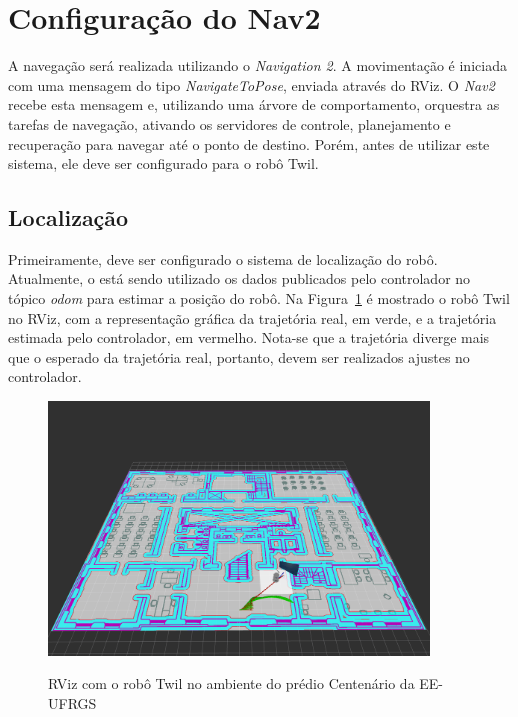 \documentclass[repeatfields,xlists,xpacks,oneside,yearsonly]{ufrgscca}
\begin{document}
\section{Configuração do Nav2}

A navegação será realizada utilizando o \textit{Navigation 2}.
A movimentação é iniciada com uma mensagem do tipo \textit{NavigateToPose},
enviada através do RViz.
O \textit{Nav2} recebe esta mensagem e, utilizando uma árvore de comportamento,
orquestra as tarefas de navegação, ativando os servidores de controle, planejamento
e recuperação para navegar até o ponto de destino.
Porém, antes de utilizar este sistema, ele deve ser configurado para o robô Twil.

\subsection{Localização}

Primeiramente, deve ser configurado o sistema de localização do robô.
Atualmente, o está sendo utilizado os dados publicados pelo controlador no
tópico \textit{odom} para estimar a posição do robô.
Na Figura~\ref{fig:robo_rviz} é mostrado o robô Twil no RViz, com a representação
gráfica da trajetória real, em verde, e a trajetória estimada pelo controlador,
em vermelho.
Nota-se que a trajetória diverge mais que o esperado da trajetória real, portanto,
devem ser realizados ajustes no controlador.

\begin{figure}[htbp]
    {
        \centering
        \caption{RViz com o robô Twil no ambiente do prédio Centenário da EE-UFRGS}
        \label{fig:robo_rviz}
        \includegraphics[width=0.9\textwidth]{erro_de_odometria.png}\\
    }
    {}
\end{figure}
\end{document}
